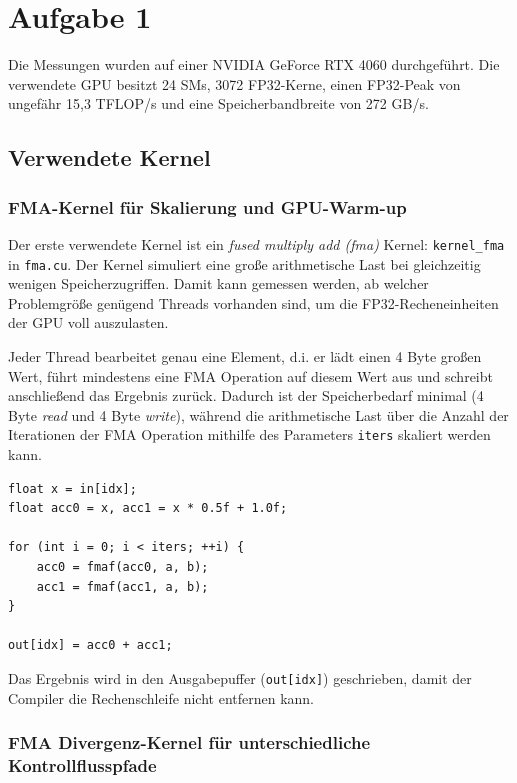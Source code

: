 
\section{Aufgabe 1}

Die Messungen wurden auf einer NVIDIA GeForce RTX 4060 durchgeführt. Die
verwendete GPU besitzt 24 SMs, 3072 FP32-Kerne, einen FP32-Peak von
ungefähr 15{,}3 TFLOP/s und eine Speicherbandbreite von 272 GB/s.

\subsection{Verwendete Kernel}

\subsubsection{FMA-Kernel für Skalierung und GPU-Warm-up}

Der erste verwendete Kernel ist ein \textit{fused multiply add (fma)} Kernel: 
\texttt{kernel\_fma} in \texttt{fma.cu}. Der Kernel simuliert eine große arithmetische 
Last bei gleichzeitig wenigen Speicherzugriffen. Damit kann gemessen werden, 
ab welcher Problemgröße genügend Threads vorhanden sind, um die FP32-Recheneinheiten 
der GPU voll auszulasten.\par

Jeder Thread bearbeitet genau eine Element, d.i. er lädt einen 4 Byte großen Wert, 
führt mindestens eine FMA Operation auf diesem Wert aus und schreibt anschließend das Ergebnis zurück. 
Dadurch ist der Speicherbedarf minimal (4 Byte \textit{read} und 4 Byte \textit{write}), 
während die arithmetische Last über die Anzahl der Iterationen der FMA Operation mithilfe 
des Parameters \texttt{iters} skaliert werden kann.

\begin{verbatim}
float x = in[idx];
float acc0 = x, acc1 = x * 0.5f + 1.0f;

for (int i = 0; i < iters; ++i) {
    acc0 = fmaf(acc0, a, b);
    acc1 = fmaf(acc1, a, b);
}

out[idx] = acc0 + acc1;
\end{verbatim}

Das Ergebnis wird in den Ausgabepuffer (\texttt{out[idx]}) geschrieben, damit der Compiler die
Rechenschleife nicht entfernen kann.

\subsubsection{FMA Divergenz-Kernel für unterschiedliche Kontrollflusspfade}

